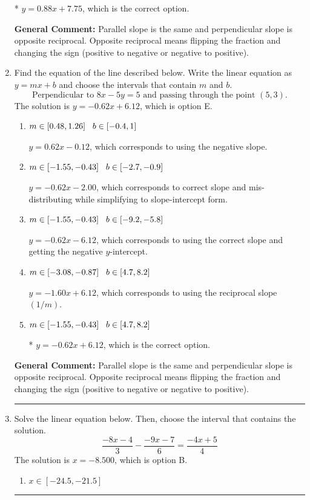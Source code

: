 \documentclass{extbook}[14pt]
\newcommand{\litem}[1]{\item #1

\rule{\textwidth}{0.4pt}}
\begin{document}
\begin{enumerate}
{\begin{enumerate}[label=\Alph*.]
* $y = 0.88x + 7.75$, which is the correct option.
\end{enumerate}

\textbf{General Comment:} Parallel slope is the same and perpendicular slope is opposite reciprocal. Opposite reciprocal means flipping the fraction and changing the sign (positive to negative or negative to positive).
}
\litem{
Find the equation of the line described below. Write the linear equation as $ y=mx+b $ and choose the intervals that contain $m$ and $b$.
\[ \text{Perpendicular to } 8 x - 5 y = 5 \text{ and passing through the point } (5, 3). \]
The solution is \( y = -0.62x + 6.12 \), which is option E.\begin{enumerate}[label=\Alph*.]
\item \( m \in [0.48, 1.26] \hspace*{3mm} b \in [-0.4, 1] \)

 $y = 0.62x - 0.12$, which corresponds to using the negative slope.
\item \( m \in [-1.55, -0.43] \hspace*{3mm} b \in [-2.7, -0.9] \)

 $y = -0.62x - 2.00$, which corresponds to correct slope and mis-distributing while simplifying to slope-intercept form.
\item \( m \in [-1.55, -0.43] \hspace*{3mm} b \in [-9.2, -5.8] \)

 $y = -0.62x - 6.12$, which corresponds to using the correct slope and getting the negative $y$-intercept.
\item \( m \in [-3.08, -0.87] \hspace*{3mm} b \in [4.7, 8.2] \)

 $y = -1.60x + 6.12$, which corresponds to using the reciprocal slope $(1/m)$.
\item \( m \in [-1.55, -0.43] \hspace*{3mm} b \in [4.7, 8.2] \)

* $y = -0.62x + 6.12$, which is the correct option.
\end{enumerate}

\textbf{General Comment:} Parallel slope is the same and perpendicular slope is opposite reciprocal. Opposite reciprocal means flipping the fraction and changing the sign (positive to negative or negative to positive).
}
\litem{
Solve the linear equation below. Then, choose the interval that contains the solution.
\[ \frac{-8x -4}{3} - \frac{-9x -7}{6} = \frac{-4x + 5}{4} \]
The solution is \( x = -8.500 \), which is option B.\begin{enumerate}[label=\Alph*.]
\item \( x \in [-24.5, -21.5] \)


\end{enumerate}}
\end{enumerate}
\end{document}
